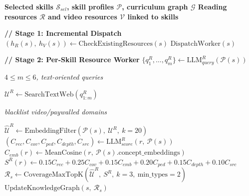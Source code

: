 \documentclass[varwidth=8.25in,border=8pt]{standalone}
\begin{document}
\setcounter{algorithm}{2}
\small
{}

\begin{algorithmic}[1]
\bfseries
\Require Selected skills $\mathcal{S}_{sel}$, skill profiles $\mathcal{P}$, curriculum graph $\mathcal{G}$
\Ensure Reading resources $\mathcal{R}$ and video resources $\mathcal{V}$ linked to skills

\State \textbf{// Stage 1: Incremental Dispatch}
    \State $(h_R(s),\ h_V(s)) \leftarrow \text{CheckExistingResources}(s)$
        \State $\text{DispatchWorker}(s)$
    \EndIf
\EndFor

\State
\State \textbf{// Stage 2: Per-Skill Resource Worker}
        \State $\{q^{R}_{1}, \dots, q^{R}_{m}\} \leftarrow \text{LLM}^{R}_{query}(\mathcal{P}(s))$
\Statex \hspace*{2.0em}\parbox[t]{0.90\linewidth}{\raggedright\scriptsize\itshape $4 \leq m \leq 6$, text-oriented queries}
        \State $\mathcal{U}^{R} \leftarrow \text{SearchTextWeb}(q^{R}_{1:m})$
\Statex \hspace*{2.0em}\parbox[t]{0.90\linewidth}{\raggedright\scriptsize\itshape blacklist video/paywalled domains}
        \State $\widehat{\mathcal{U}}^{R} \leftarrow \text{EmbeddingFilter}(\mathcal{P}(s),\ \mathcal{U}^{R},\ k{=}20)$
            \State $(C_{rec}, C_{cov}, C_{ped}, C_{depth}, C_{src}) \leftarrow \text{LLM}^{R}_{score}(r,\ \mathcal{P}(s))$
            \State $C_{emb}(r) \leftarrow \text{MeanCosine}(r,\ \mathcal{P}(s).\text{concept\_embeddings})$
            \State $S^{R}(r) \leftarrow 0.15C_{rec} + 0.25C_{cov} + 0.15C_{emb} + 0.20C_{ped} + 0.15C_{depth} + 0.10C_{src}$
        \EndFor
        \State $\mathcal{R}_{s} \leftarrow \text{CoverageMaxTopK}(\widehat{\mathcal{U}}^{R},\ S^{R},\ k{=}3,\ \text{min\_types}{=}2)$
        \State $\text{UpdateKnowledgeGraph}(s,\ \mathcal{R}_{s})$
    \EndIf


\end{algorithmic}
\end{document}
